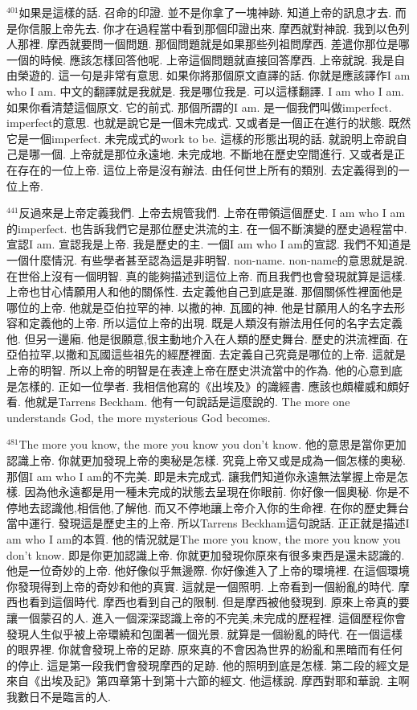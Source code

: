 \documentclass{book}
\begin{document}
$^{401}$如果是這樣的話.
召命的印證.
並不是你拿了一塊神跡.
知道上帝的訊息才去.
而是你信服上帝先去.
你才在過程當中看到那個印證出來.
摩西就對神說.
我到以色列人那裡.
摩西就要問一個問題.
那個問題就是如果那些列祖問摩西.
差遣你那位是哪一個的時候.
應該怎樣回答他呢.
上帝這個問題就直接回答摩西.
上帝就說.
我是自由榮遊的.
這一句是非常有意思.
如果你將那個原文直譯的話.
你就是應該譯作I am who I am.
中文的翻譯就是我就是.
我是哪位我是.
可以這樣翻譯.
I am who I am.
如果你看清楚這個原文.
它的前式.
那個所謂的I am.
是一個我們叫做imperfect.
imperfect的意思.
也就是說它是一個未完成式.
又或者是一個正在進行的狀態.
既然它是一個imperfect.
未完成式的work to be.
這樣的形態出現的話.
就說明上帝說自己是哪一個.
上帝就是那位永遠地.
未完成地.
不斷地在歷史空間進行.
又或者是正在存在的一位上帝.
這位上帝是沒有辦法.
由任何世上所有的類別.
去定義得到的一位上帝.

$^{441}$反過來是上帝定義我們.
上帝去規管我們.
上帝在帶領這個歷史.
I am who I am的imperfect.
也告訴我們它是那位歷史洪流的主.
在一個不斷演變的歷史過程當中.
宣認I am.
宣認我是上帝.
我是歷史的主.
一個I am who I am的宣認.
我們不知道是一個什麼情況.
有些學者甚至認為這是非明智.
non-name.
non-name的意思就是說.
在世俗上沒有一個明智.
真的能夠描述到這位上帝.
而且我們也會發現就算是這樣.
上帝也甘心情願用人和他的關係性.
去定義他自己到底是誰.
那個關係性裡面他是哪位的上帝.
他就是亞伯拉罕的神.
以撒的神.
瓦國的神.
他是甘願用人的名字去形容和定義他的上帝.
所以這位上帝的出現.
既是人類沒有辦法用任何的名字去定義他.
但另一邊廂.
他是很願意,很主動地介入在人類的歷史舞台.
歷史的洪流裡面.
在亞伯拉罕,以撒和瓦國這些祖先的經歷裡面.
去定義自己究竟是哪位的上帝.
這就是上帝的明智.
所以上帝的明智是在表達上帝在歷史洪流當中的作為.
他的心意到底是怎樣的.
正如一位學者.
我相信他寫的《出埃及》的識經書.
應該也頗權威和頗好看.
他就是Tarrens Beckham.
他有一句說話是這麼說的.
The more one understands God, the more mysterious God becomes.

$^{481}$The more you know, the more you know you don't know.
他的意思是當你更加認識上帝.
你就更加發現上帝的奧秘是怎樣.
究竟上帝又或是成為一個怎樣的奧秘.
那個I am who I am的不完美.
即是未完成式.
讓我們知道你永遠無法掌握上帝是怎樣.
因為他永遠都是用一種未完成的狀態去呈現在你眼前.
你好像一個奧秘.
你是不停地去認識他,相信他,了解他.
而又不停地讓上帝介入你的生命裡.
在你的歷史舞台當中運行.
發現這是歷史主的上帝.
所以Tarrens Beckham這句說話.
正正就是描述I am who I am的本質.
他的情況就是The more you know, the more you know you don't know.
即是你更加認識上帝.
你就更加發現你原來有很多東西是還未認識的.
他是一位奇妙的上帝.
他好像似乎無邊際.
你好像進入了上帝的環境裡.
在這個環境你發現得到上帝的奇妙和他的真實.
這就是一個照明.
上帝看到一個紛亂的時代.
摩西也看到這個時代.
摩西也看到自己的限制.
但是摩西被他發現到.
原來上帝真的要讓一個蒙召的人.
進入一個深深認識上帝的不完美,未完成的歷程裡.
這個歷程你會發現人生似乎被上帝環繞和包圍著一個光景.
就算是一個紛亂的時代.
在一個這樣的眼界裡.
你就會發現上帝的足跡.
原來真的不會因為世界的紛亂和黑暗而有任何的停止.
這是第一段我們會發現摩西的足跡.
他的照明到底是怎樣.
第二段的經文是來自《出埃及記》第四章第十到第十六節的經文.
他這樣說.
摩西對耶和華說.
主啊 我數日不是臨言的人.
\end{document}
